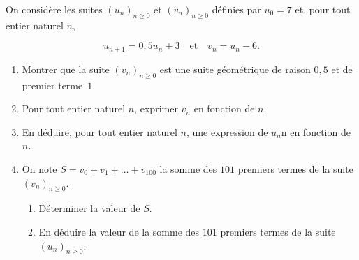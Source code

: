 \medskip

On considère les suites $\left(u_n\right)_{n\geqslant 0}$ et $\left(v_n\right)_{n\geqslant 0}$ définies par $u_0 = 7$ et, pour tout entier naturel $n$,

\[u_{n+1} = 0,5u_n + 3\quad \text{et}\quad v_n = u_n - 6.\]

\medskip

\begin{enumerate}
\item Montrer que la suite $\left(v_n\right)_{n\geqslant 0}$ est une suite géométrique de raison $0,5$ et de premier terme~$1$.
\item Pour tout entier naturel $n$, exprimer $v_n$ en fonction de $n$.
\item En déduire, pour tout entier naturel $n$, une expression de $u_n$n en fonction de $n$.
\item On note $S = v_0 + v_1 + \ldots + v_{100}$ la somme des $101$ premiers termes de la suite $\left(v_n\right)_{n\geqslant 0}$.
	\begin{enumerate}
		\item Déterminer la valeur de $S$.
		\item En déduire la valeur de la somme des $101$ premiers termes de la suite $\left(u_n\right)_{n\geqslant 0}$.
	\end{enumerate}
\end{enumerate}

\bigskip
